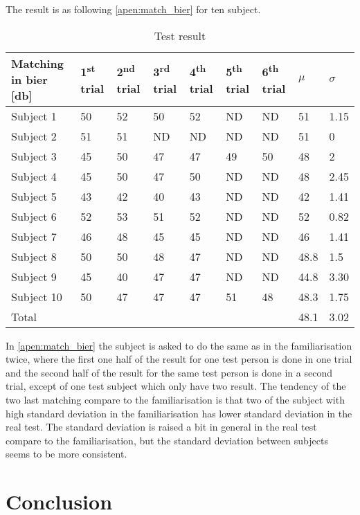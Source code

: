 The result is as following \autoref{apen:match_bier} for ten subject. 
\begin{table}[H]
\centering
\caption{Test result}
\begin{tabular}{lllllllll}
\multicolumn{1}{l|}{Matching in \gls{bier} [\si{\decibel}] }   & 1\textsuperscript{st} trial & 2\textsuperscript{nd} trial & 3\textsuperscript{rd} trial & 4\textsuperscript{th} trial & 5\textsuperscript{th} trial & \multicolumn{1}{l|}{6\textsuperscript{th} trial}                & $\mu$   & $\sigma$ \\ \hline
\multicolumn{1}{l|}{Subject 1}  & 50    & 52    & 50    & 52    & ND    & \multicolumn{1}{l|}{ND} & 51   & 1.15  \\
\multicolumn{1}{l|}{Subject 2}  & 51    & 51    & ND    & ND    & ND    & \multicolumn{1}{l|}{ND} & 51   & 0     \\
\multicolumn{1}{l|}{Subject 3}  & 45    & 50    & 47    & 47    & 49    & \multicolumn{1}{l|}{50} & 48   & 2     \\
\multicolumn{1}{l|}{Subject 4}  & 45    & 50    & 47    & 50    & ND    & \multicolumn{1}{l|}{ND} & 48   & 2.45  \\
\multicolumn{1}{l|}{Subject 5}  & 43    & 42    & 40    & 43    & ND    & \multicolumn{1}{l|}{ND} & 42   & 1.41  \\
\multicolumn{1}{l|}{Subject 6}  & 52    & 53    & 51    & 52    & ND    & \multicolumn{1}{l|}{ND} & 52   & 0.82  \\
\multicolumn{1}{l|}{Subject 7}  & 46    & 48    & 45    & 45    & ND    & \multicolumn{1}{l|}{ND} & 46   & 1.41  \\
\multicolumn{1}{l|}{Subject 8}  & 50    & 50    & 48    & 47    & ND    & \multicolumn{1}{l|}{ND} & 48.8 & 1.5   \\
\multicolumn{1}{l|}{Subject 9}  & 45    & 40    & 47    & 47    & ND    & \multicolumn{1}{l|}{ND} & 44.8 & 3.30  \\
\multicolumn{1}{l|}{Subject 10} & 50    & 47    & 47    & 47    & 51    & \multicolumn{1}{l|}{48} & 48.3 & 1.75  \\ \hline
\multicolumn{1}{l|}{Total}      &       &       &       &       &       & \multicolumn{1}{l|}{}   & 48.1     & 3.02     
\end{tabular}
\label{apen:match_bier} 
\end{table}

In \autoref{apen:match_bier} the subject is asked to do the same as in the familiarisation twice, where the first one half of the result for one test person is done in one trial and the second half of the result for the same test person is done in a second trial, except of one test subject which only have two result. The tendency of the two last matching compare to the familiarisation is that two of the subject with high standard deviation in the familiarisation has lower standard deviation in the real test. The standard deviation is raised a bit in general in the real test compare to the familiarisation, but the standard deviation between subjects seems to be more consistent. 

\section*{Conclusion}



